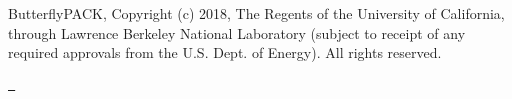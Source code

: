 Butterfly\+PACK, Copyright (c) 2018, The Regents of the University of California, through Lawrence Berkeley National Laboratory (subject to receipt of any required approvals from the U.\+S. Dept. of Energy). All rights reserved.

\href{https://travis-ci.com/liuyangzhuan/ButterflyPACK}{\texttt{ }} 